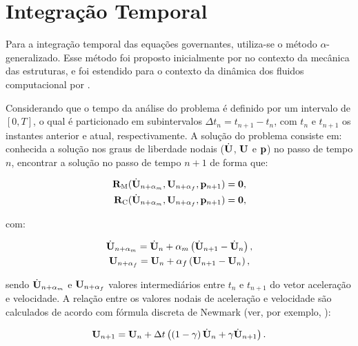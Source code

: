 \documentclass[tese_patricia]{subfiles}%
\begin{document}
\section{Integração Temporal}\label{sec:IntegTemp}

Para a integração temporal das equações governantes, utiliza-se o método $\alpha$-generalizado. Esse método foi proposto inicialmente por  no contexto da mecânica das estruturas, e foi estendido para o contexto da dinâmica dos fluidos computacional por .

Considerando que o tempo da análise do problema é definido por um intervalo de $[0,T]$, o qual é particionado em subintervalos $\Delta t_{n} = t_{n+1} - t_{n}$, com $t_{n}$ e $t_{n+1}$ os instantes anterior e atual, respectivamente. A solução do problema consiste em: conhecida a solução nos graus de liberdade nodais ($\dot{\mathbf{U}}$, $\mathbf{U}$ e $\mathbf{p}$) no passo de tempo $n$, encontrar a solução no passo de tempo $n+1$ de forma que:

\begin{align}
\mathbf{R}_\mathrm{M}(\dot{\mathbf{U}}_{n+\alpha_m},\mathbf{U}_{n+\alpha_f},\mathbf{p}_{n+1}) = \mathbf{0}, \label{eq:momentum_residual_alpha}\\
\mathbf{R}_\mathrm{C}(\dot{\mathbf{U}}_{n+\alpha_m},\mathbf{U}_{n+\alpha_f},\mathbf{p}_{n+1}) = \mathbf{0}, \label{eq:continuity_residual_alpha}
\end{align}

\noindent com:

\begin{gather}
\dot{\mathbf{U}}_{n+\alpha_m} = \dot{\mathbf{U}}_n + \alpha_m \left( \dot{\mathbf{U}}_{n+1} - \dot{\mathbf{U}}_n \right), \label{eq:approx_acceleration}\\
\mathbf{U}_{n+\alpha_f} = \mathbf{U}_n + \alpha_f \left( \mathbf{U}_{n+1} - \mathbf{U}_n \right), \label{eq:approx_velocity}
\end{gather}

\noindent sendo $\dot{\mathbf{U}}_{n+\alpha_m}$ e $\mathbf{U}_{n+\alpha_f}$ valores intermediários entre $t_{n}$ e $t_{n+1}$ do vetor aceleração e velocidade. A relação entre os valores nodais de aceleração e velocidade são calculados de acordo com fórmula discreta de Newmark (ver, por exemplo, \cite{Hughes:1976}):

\begin{gather}
\mathbf{U}_{n+1} = \mathbf{U}_n + \Delta t\left(\left(1-\gamma\right)\dot{\mathbf{U}}_n + \gamma\dot{\mathbf{U}}_{n+1} \right). \label{eq:newmark}
\end{gather}
\end{document}
